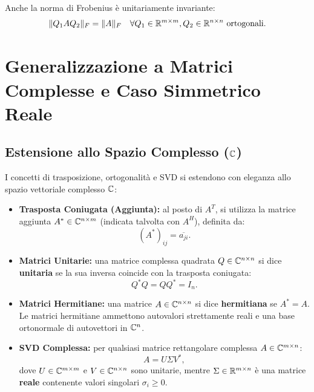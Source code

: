 \begin{corollary}
Anche la norma di Frobenius \`e unitariamente invariante:
\begin{equation}
    \|Q_1 A Q_2\|_F = \|A\|_F \quad \forall Q_1 \in \mathbb{R}^{m \times m}, Q_2 \in \mathbb{R}^{n \times n} \text{ ortogonali}.
\end{equation}
\end{corollary}

\FloatBarrier
\section{Generalizzazione a Matrici Complesse e Caso Simmetrico Reale}
\label{sec:matrici-complesse-simmetriche}

\subsection{Estensione allo Spazio Complesso ($\mathbb{C}$)}

I concetti di trasposizione, ortogonalit\`a e SVD si estendono con eleganza allo spazio vettoriale complesso $\mathbb{C}$:
\begin{itemize}
    \item \textbf{Trasposta Coniugata (Aggiunta):} al posto di $A^T$, si utilizza la matrice aggiunta $A^* \in \mathbb{C}^{n \times m}$ (indicata talvolta con $A^H$), definita da:
    \begin{equation}
        (A^*)_{ij} = \overline{a_{ji}}.
    \end{equation}
    \item \textbf{Matrici Unitarie:} una matrice complessa quadrata $Q \in \mathbb{C}^{n \times n}$ si dice \textbf{unitaria} se la sua inversa coincide con la trasposta coniugata:
    \begin{equation}
        Q^* Q = Q Q^* = I_n.
    \end{equation}
    \item \textbf{Matrici Hermitiane:} una matrice $A \in \mathbb{C}^{n \times n}$ si dice \textbf{hermitiana} se $A^* = A$. Le matrici hermitiane ammettono autovalori strettamente reali e una base ortonormale di autovettori in $\mathbb{C}^n$.
    \item \textbf{SVD Complessa:} per qualsiasi matrice rettangolare complessa $A \in \mathbb{C}^{m \times n}$:
    \begin{equation}
        A = U \Sigma V^*,
    \end{equation}
    dove $U \in \mathbb{C}^{m \times m}$ e $V \in \mathbb{C}^{n \times n}$ sono unitarie, mentre $\Sigma \in \mathbb{R}^{m \times n}$ \`e una matrice \textbf{reale} contenente valori singolari $\sigma_i \ge 0$.
\end{itemize}

